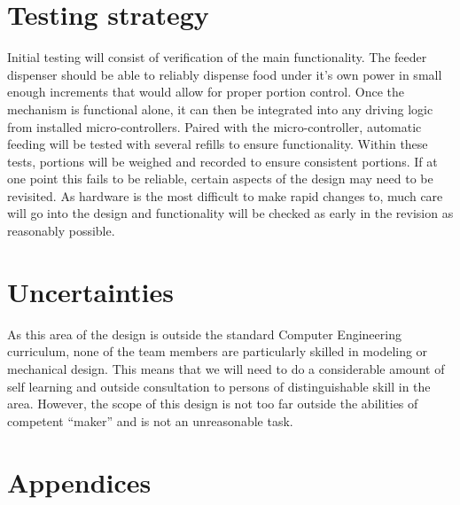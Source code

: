 \documentclass[12pt]{article}
\begin{document}
\section{Testing strategy}
Initial testing will consist of verification of the main functionality. The feeder dispenser should be able to reliably dispense food under it’s own power in small enough increments that would allow for proper portion control. Once the mechanism is functional alone, it can then be integrated into any driving logic from installed micro-controllers. Paired with the micro-controller, automatic feeding will be tested with several refills to ensure functionality. Within these tests, portions will be weighed and recorded to ensure consistent portions. If at one point this fails to be reliable, certain aspects of the design may need to be revisited. As hardware is the most difficult to make rapid changes to, much care will go into the design and functionality will be checked as early in the revision as reasonably possible.
\section{Uncertainties}
As this area of the design is outside the standard Computer Engineering curriculum, none of the team members are particularly skilled in modeling or mechanical design. This means that we will need to do a considerable amount of self learning and outside consultation to persons of distinguishable skill in the area. However, the scope of this design is not too far outside the abilities of competent “maker” and is not an unreasonable task.


\pagebreak
\section{Appendices}
\end{document}
